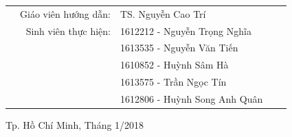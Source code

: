 \begin{titlepage}
\begin{table}[h]
\begin{tabular}{rrlrr}
\hspace{5cm} 
& Giáo viên hướng dẫn: & TS. Nguyễn Cao Trí & & \\ 
& Sinh viên thực hiện: & 1612212 - Nguyễn Trọng Nghĩa \\
&  & 1613535 - Nguyễn Văn Tiến\\
&  & 1610852 - Huỳnh Sâm Hà\\
&  & 1613575 - Trần Ngọc Tín\\
&  & 1612806 - Huỳnh Song Anh Quân\\
\end{tabular}
\end{table}

\vspace{2cm}

\begin{center}
{\footnotesize Tp. Hồ Chí Minh, Tháng 1/2018}
\end{center}

\end{titlepage}
